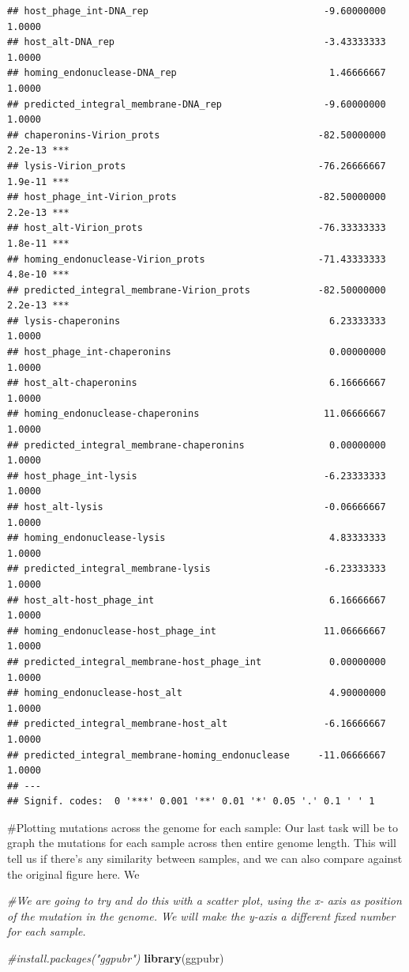 \documentclass[
]{article}
\newenvironment{Shaded}{\begin{snugshade}}{\end{snugshade}}
\newcommand{\CommentTok}[1]{\textcolor[rgb]{0.56,0.35,0.01}{\textit{#1}}}
\newcommand{\KeywordTok}[1]{\textcolor[rgb]{0.13,0.29,0.53}{\textbf{#1}}}
\newcommand{\NormalTok}[1]{#1}
\begin{document}
\begin{verbatim}
## host_phage_int-DNA_rep                               -9.60000000  1.0000    
## host_alt-DNA_rep                                     -3.43333333  1.0000    
## homing_endonuclease-DNA_rep                           1.46666667  1.0000    
## predicted_integral_membrane-DNA_rep                  -9.60000000  1.0000    
## chaperonins-Virion_prots                            -82.50000000 2.2e-13 ***
## lysis-Virion_prots                                  -76.26666667 1.9e-11 ***
## host_phage_int-Virion_prots                         -82.50000000 2.2e-13 ***
## host_alt-Virion_prots                               -76.33333333 1.8e-11 ***
## homing_endonuclease-Virion_prots                    -71.43333333 4.8e-10 ***
## predicted_integral_membrane-Virion_prots            -82.50000000 2.2e-13 ***
## lysis-chaperonins                                     6.23333333  1.0000    
## host_phage_int-chaperonins                            0.00000000  1.0000    
## host_alt-chaperonins                                  6.16666667  1.0000    
## homing_endonuclease-chaperonins                      11.06666667  1.0000    
## predicted_integral_membrane-chaperonins               0.00000000  1.0000    
## host_phage_int-lysis                                 -6.23333333  1.0000    
## host_alt-lysis                                       -0.06666667  1.0000    
## homing_endonuclease-lysis                             4.83333333  1.0000    
## predicted_integral_membrane-lysis                    -6.23333333  1.0000    
## host_alt-host_phage_int                               6.16666667  1.0000    
## homing_endonuclease-host_phage_int                   11.06666667  1.0000    
## predicted_integral_membrane-host_phage_int            0.00000000  1.0000    
## homing_endonuclease-host_alt                          4.90000000  1.0000    
## predicted_integral_membrane-host_alt                 -6.16666667  1.0000    
## predicted_integral_membrane-homing_endonuclease     -11.06666667  1.0000    
## ---
## Signif. codes:  0 '***' 0.001 '**' 0.01 '*' 0.05 '.' 0.1 ' ' 1
\end{verbatim}

\#Plotting mutations across the genome for each sample: Our last task
will be to graph the mutations for each sample across then entire genome
length. This will tell us if there's any similarity between samples, and
we can also compare against the original figure here. We

\begin{Shaded}
\begin{Highlighting}[]
\CommentTok{#We are going to try and do this with a scatter plot, using the x- axis as position of the mutation in the genome. We will make the y-axis a different fixed number for each sample. }

\CommentTok{#install.packages("ggpubr")}
\KeywordTok{library}\NormalTok{(ggpubr)}
\end{Highlighting}
\end{Shaded}
\end{document}
